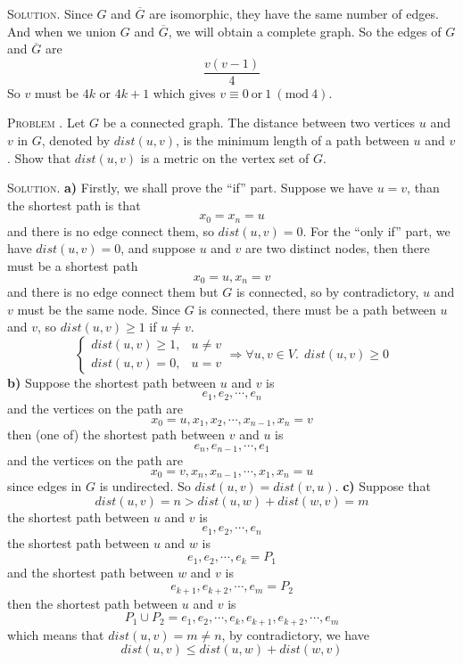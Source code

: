\documentclass[12pt, a4paper, oneside]{article}
\newcounter{problemname}
\newenvironment{problem}{\stepcounter{problemname}\par\noindent\textsc{Problem \arabic{problemname}. }}{\\\par}
\newenvironment{solution}{\par\noindent\textsc{Solution. }}{\\\par}
\begin{document}
\begin{solution}
    Since $G$ and $\overline{G}$ are isomorphic, they have the same number of edges. And when we union $G$ and $\overline{G}$,
    we will obtain a complete graph. So the edges of $G$ and $\overline{G}$ are
    \[ \frac{v(v-1)}{4} \]
    So $v$ must be $4k$ or $4k+1$ which gives $v\equiv 0\ \text{or}\ 1\ (\text{mod}\ 4)$.
\end{solution}

\begin{problem}
    Let $G$ be a connected graph. The distance between two vertices $u$ and $v$ in $G$, denoted by $dist(u,v)$, is the
    minimum length of a path between $u$ and $v$. Show that $dist(u,v)$ is a metric on the vertex set of $G$.
\end{problem}

\begin{solution}
    \textbf{a)} Firstly, we shall prove the ``if'' part. Suppose we have $u = v$, than the shortest path is that
    \[ x_0 = x_{n} = u \]
    and there is no edge connect them, so $dist(u,v) = 0$. For the ``only if'' part, we have $dist(u,v) = 0$,
    and suppose $u$ and $v$ are two distinct nodes, then there must be a shortest path
    \[ x_0 = u, x_{n} = v \]
    and there is no edge connect them but $G$ is connected, so by contradictory, $u$ and $v$ must be the same node.
    Since $G$ is connected, there must be a path between $u$ and $v$, so $dist(u,v) \ge 1$ if $u \neq v$.
    \[ \begin{cases}
        dist(u,v) \ge 1, & u\neq v \\
        dist(u,v) = 0, & u = v
    \end{cases} \Rightarrow \forall u,v\in V. \ \ dist(u,v)\ge 0 \]
    \newline\textbf{b)} Suppose the shortest path between $u$ and $v$ is
    \[ e_1, e_2, \cdots, e_n \]
    and the vertices on the path are
    \[ x_0 = u, x_1, x_2, \cdots, x_{n-1}, x_n = v \]
    then (one of) the shortest path between $v$ and $u$ is
    \[ e_n, e_{n-1}, \cdots, e_1 \]
    and the vertices on the path are
    \[ x_0 = v, x_n, x_{n-1}, \cdots, x_1, x_n = u \]
    since edges in $G$ is undirected. So $dist(u,v) = dist(v,u)$.
    \newline\textbf{c)} Suppose that
    \[ dist(u,v) = n > dist(u,w) + dist(w,v) = m \]
    the shortest path between $u$ and $v$ is
    \[ e_1, e_2, \cdots, e_n \]
    the shortest path between $u$ and $w$ is
    \[ e_1, e_2, \cdots, e_k = P_1 \]
    and the shortest path between $w$ and $v$ is
    \[ e_{k+1}, e_{k+2}, \cdots, e_m = P_2\]
    then the shortest path between $u$ and $v$ is
    \[ P_1\cup P_2 =  e_1, e_2, \cdots, e_k, e_{k+1}, e_{k+2}, \cdots, e_m \]
    which means that $dist(u,v) = m \neq n$, by contradictory, we have
    \[ dist(u,v) \le dist(u,w) + dist(w,v) \]
\end{solution}
\end{document}
